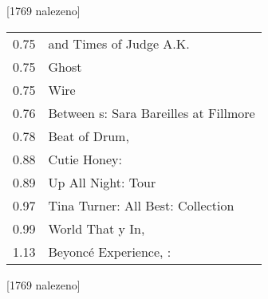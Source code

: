 \begin{table}[H]
\begin{tt}

\horizlina

\noindent
\begin{minipage}[t]{.5\textwidth}\vspace{0pt}
 [1769 nalezeno]\vspace{5pt}

\begin{tabulary}{1.1\textwidth}{LL}
0.75 &   and Times of Judge A.K. \\
0.75 &   Ghost \\
0.75 &   Wire \\
0.76 & Between  s: Sara Bareilles  at  Fillmore \\
0.78 & Beat of   Drum,  \\
0.88 & Cutie Honey:   \\
0.89 & Up All Night:   Tour \\
0.97 & Tina Turner: All  Best:   Collection \\
0.99 & World That y  In,  \\
1.13 & Beyoncé Experience, :  \\
\end{tabulary}
\end{minipage}
\begin{minipage}[t]{.5\textwidth}\vspace{0pt}
 [1769 nalezeno]\vspace{5pt}


\end{minipage}
\end{tt}
\end{table}
